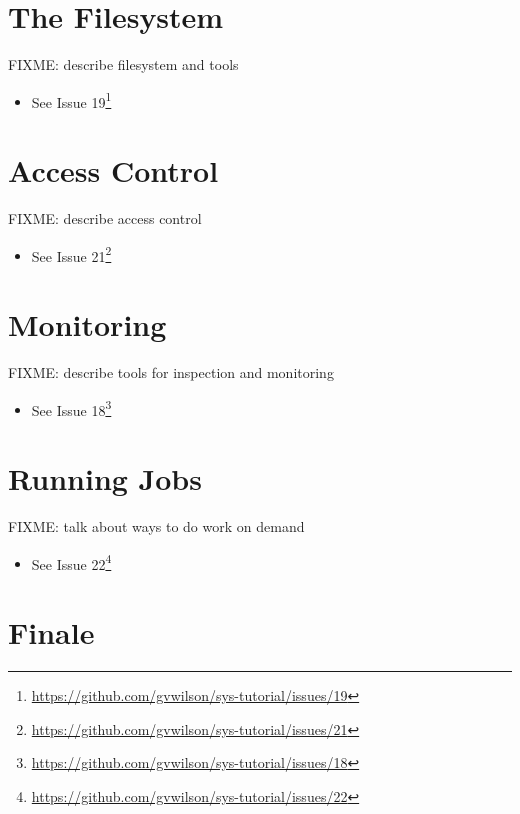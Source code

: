 \documentclass[krantzl]{krantz}
\newcommand{\hreffoot}[2]{{#1}\footnote{\href{#2}{#2}}}
\begin{document}
\chapter{The Filesystem}\label{fs}




FIXME: describe filesystem and tools

\begin{itemize}
\item See \hreffoot{Issue 19}{https://github.com/gvwilson/sys-tutorial/issues/19}

\end{itemize}
\chapter{Access Control}\label{access}




FIXME: describe access control

\begin{itemize}
\item See \hreffoot{Issue 21}{https://github.com/gvwilson/sys-tutorial/issues/21}

\end{itemize}
\chapter{Monitoring}\label{monitor}




FIXME: describe tools for inspection and monitoring

\begin{itemize}
\item See \hreffoot{Issue 18}{https://github.com/gvwilson/sys-tutorial/issues/18}

\end{itemize}
\chapter{Running Jobs}\label{jobs}




FIXME: talk about ways to do work on demand

\begin{itemize}
\item See \hreffoot{Issue 22}{https://github.com/gvwilson/sys-tutorial/issues/22}

\end{itemize}
\chapter{Finale}\label{finale}
\end{document}
